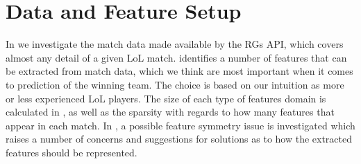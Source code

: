 \section{Data and Feature Setup}\label{sec:features}
In  we investigate the match data made available by the RGs API, which covers almost any detail of a given LoL match.
 identifies a number of features that can be extracted from match data, which we think are most important when it comes to prediction of the winning team. The choice is based on our intuition as more or less experienced LoL players. The size of each type of features domain is calculated in , as well as the sparsity with regards to how many features that appear in each match.
In , a possible feature symmetry issue is investigated which raises a number of concerns and suggestions for solutions as to how the extracted features should be represented. 


